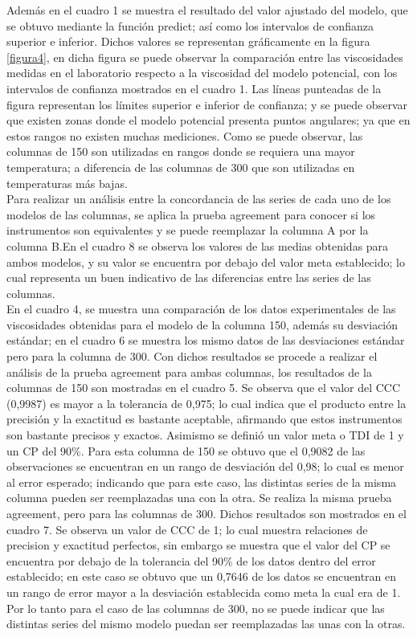 \documentclass[12, letterpaper]{article}
\begin{document}
Además en el cuadro 1 se muestra el resultado del valor ajustado del modelo, que se obtuvo mediante la función predict; así como los intervalos de confianza superior e inferior. Dichos valores se representan gráficamente en la figura \ref{figura4}, en dicha figura se puede observar la comparación entre las viscosidades medidas en el laboratorio respecto a la viscosidad del modelo potencial, con los intervalos de confianza mostrados en el cuadro 1. Las líneas punteadas de la figura representan los límites superior e inferior de confianza; y se puede observar que existen zonas donde el modelo potencial presenta puntos angulares; ya que en estos rangos no existen muchas mediciones. Como se puede observar, las columnas de 150 son utilizadas en rangos donde se requiera una mayor temperatura; a diferencia de las columnas de 300 que son utilizadas en temperaturas más bajas.\\ 
Para realizar un análisis entre la concordancia de las series de cada uno de los modelos de las columnas, se aplica la prueba agreement para conocer si los instrumentos son equivalentes y se puede reemplazar la columna A por la columna B.En el cuadro 8 se observa los valores de las medias obtenidas para ambos modelos, y su valor se encuentra por debajo del valor meta establecido; lo cual representa un buen indicativo de las diferencias entre las series de las columnas.\\
En el cuadro 4, se muestra una comparación de los datos experimentales de las viscosidades obtenidas para el modelo de la columna 150, además su desviación estándar; en el cuadro 6 se muestra los mismo datos de las desviaciones estándar pero para la columna de 300. Con dichos resultados se procede a realizar el análisis de la prueba agreement para ambas columnas, los resultados de la columnas de 150 son mostradas en el cuadro 5. Se observa que el valor del CCC (0,9987) es mayor a la tolerancia de 0,975; lo cual indica que el producto entre la precisión y la exactitud es bastante aceptable, afirmando que estos instrumentos son bastante precisos y exactos. Asimismo se definió un valor meta o TDI de 1 y un CP del 90\%. Para esta columna de 150 se obtuvo que el 0,9082 de las observaciones se encuentran en un rango de desviación del 0,98; lo cual es menor al error esperado; indicando que para este caso, las distintas series de la misma columna pueden ser reemplazadas una con la otra. 
Se realiza la misma prueba agreement, pero para las columnas de 300. Dichos resultados son mostrados en el cuadro 7. Se observa un valor de CCC de 1; lo cual muestra relaciones de precision y exactitud perfectos, sin embargo se muestra que el valor del CP se encuentra por debajo de la tolerancia del 90\% de los datos dentro del error establecido; en este caso se obtuvo que un 0,7646 de los datos se encuentran en un rango de error mayor a la desviación establecida como meta la cual era de 1. Por lo tanto para el caso de las columnas de 300, no se puede indicar que las distintas series del mismo modelo puedan ser reemplazadas las unas con la otras.\\ 
\end{document}
